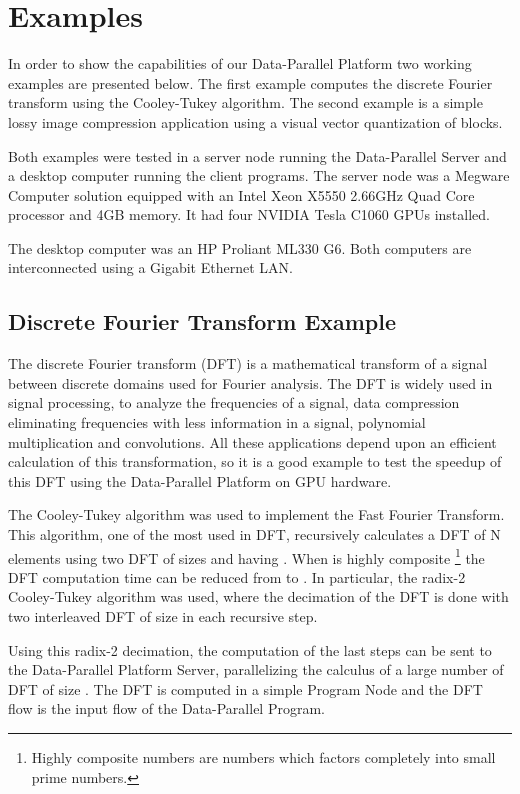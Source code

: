 \documentclass[conference]{IEEEtran}
\begin{document}
\section{Examples}

In order to show the capabilities of our Data-Parallel Platform two working
examples are presented below. The first example computes the discrete Fourier
transform using the Cooley-Tukey algorithm. The second example is a simple lossy
image compression application using a visual vector quantization of blocks.

Both examples were tested in a server node running the Data-Parallel Server and
a desktop computer running the client programs.  The server node was a Megware
Computer solution equipped with an Intel Xeon X5550 2.66GHz Quad Core processor
and 4GB memory. It had four NVIDIA Tesla C1060 GPUs installed.
 
The desktop computer was an HP Proliant ML330 G6. Both computers are
interconnected using a Gigabit Ethernet LAN.

\subsection{Discrete Fourier Transform Example}

The discrete Fourier transform (DFT) is a mathematical transform of a signal
between discrete domains used for Fourier analysis. The DFT is widely used in
signal processing, to analyze the frequencies of a signal, data compression
eliminating frequencies with less information in a signal, polynomial
multiplication and convolutions. All these applications depend upon an efficient
calculation of this transformation, so it is a good example to test the speedup
of this DFT using the Data-Parallel Platform on GPU hardware.

The Cooley-Tukey\cite{CooleyTukey} algorithm was used to implement the Fast
Fourier Transform.  This algorithm, one of the most used in DFT, recursively
calculates a DFT of N elements using two DFT of sizes  and  having
. When  is highly composite \footnote{Highly composite numbers
  are numbers which factors completely into small prime numbers.} the DFT
computation time can be reduced from  to .  In
particular, the radix-2 Cooley-Tukey algorithm was used, where the decimation of
the DFT is done with two interleaved DFT of size  in each recursive step.

Using this radix-2 decimation, the computation of the last  steps can be sent
to the Data-Parallel Platform Server, parallelizing the calculus of a large
number of DFT of size .  The  DFT is computed in a simple Program Node
and the DFT flow is the input flow of the Data-Parallel Program.
\end{document}

